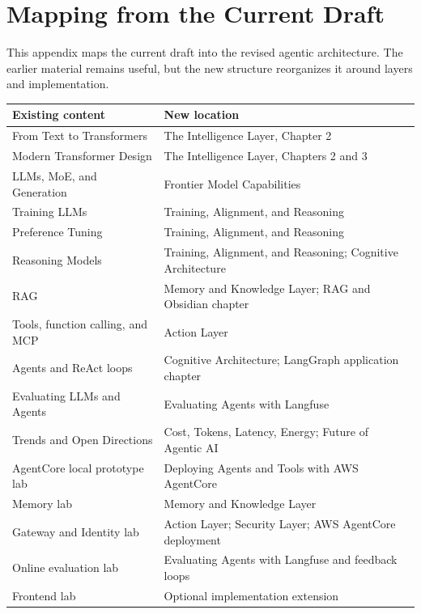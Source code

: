 \chapter{Mapping from the Current Draft}

This appendix maps the current draft into the revised agentic architecture. The earlier material remains useful, but the new structure reorganizes it around layers and implementation.

\begin{longtable}{p{}p{}}
\toprule
\textbf{Existing content} & \textbf{New location} \\
\midrule
From Text to Transformers & The Intelligence Layer, Chapter 2 \\
Modern Transformer Design & The Intelligence Layer, Chapters 2 and 3 \\
LLMs, MoE, and Generation & Frontier Model Capabilities \\
Training LLMs & Training, Alignment, and Reasoning \\
Preference Tuning & Training, Alignment, and Reasoning \\
Reasoning Models & Training, Alignment, and Reasoning; Cognitive Architecture \\
RAG & Memory and Knowledge Layer; RAG and Obsidian chapter \\
Tools, function calling, and MCP & Action Layer \\
Agents and ReAct loops & Cognitive Architecture; LangGraph application chapter \\
Evaluating LLMs and Agents & Evaluating Agents with Langfuse \\
Trends and Open Directions & Cost, Tokens, Latency, Energy; Future of Agentic AI \\
AgentCore local prototype lab & Deploying Agents and Tools with AWS AgentCore \\
Memory lab & Memory and Knowledge Layer \\
Gateway and Identity lab & Action Layer; Security Layer; AWS AgentCore deployment \\
Online evaluation lab & Evaluating Agents with Langfuse and feedback loops \\
Frontend lab & Optional implementation extension \\
\bottomrule
\end{longtable}
